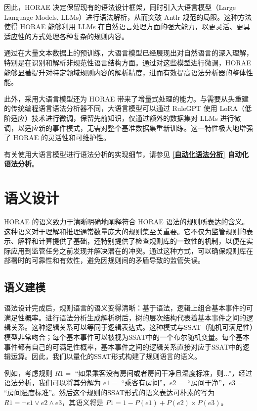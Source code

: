 因此，HORAE 决定保留现有的语法设计框架，同时引入大语言模型（Large Language Models, LLMs）进行语法解析，从而突破 Antlr 规范的局限。这种方法使得 HORAE 能够利用 LLMs 在自然语言处理方面的强大能力，以更灵活、更具适应性的方式处理各种复杂的规则内容。

通过在大量文本数据上的预训练，大语言模型已经展现出对自然语言的深入理解，特别是在识别和解析非规范性语言结构方面。通过对这些模型进行微调，HORAE 能够显著提升对特定领域规则内容的解析精度，进而有效提高语法分析器的整体性能。

此外，采用大语言模型还为 HORAE 带来了增量式处理的能力。与需要从头重建的传统编程语言语法分析器不同，大语言模型可以通过 RuleGPT 使用 LoRA（低阶适应）技术进行微调，保留先前知识，仅通过额外的数据集对 LLMs 进行微调，以适应新的事件模式，无需对整个基准数据集重新训练。这一特性极大地增强了 HORAE 的灵活性和可维护性。

有关使用大语言模型进行语法分析的实现细节，请参见 \textbf{\ref{自动化语法分析} 自动化语法分析}。

\cleardoublepage

\section{语义设计}

HORAE 的语义致力于清晰明确地阐释符合 HORAE 语法的规则所表达的含义。这种语义对于理解和推理通常数量庞大的规则集至关重要。它不仅为监管规则的表示、解释和计算提供了基础，还特别提供了检查规则库的一致性的机制，以便在实际应用到监管任务之前发现并解决潜在的冲突。通过这种方式，可以确保规则库在部署时的可靠性和有效性，避免因规则间的矛盾导致的监管失误。

\subsection{语义建模}

语法设计完成后，规则语言的语义变得清晰：基于语法，逻辑上组合基本事件的可满足性概率。进行语法分析生成解析树后，树的层次结构代表着基本事件之间的逻辑关系。这种逻辑关系可以等同于逻辑表达式。这种模式与SSAT（随机可满足性）模型非常吻合；每个基本事件可以被视为SSAT中的一个布尔随机变量。每个基本事件都有自己的可满足性概率，基本事件之间的逻辑关系直接对应于SSAT中的逻辑运算。因此，我们以量化的SSAT形式构建了规则语言的语义。

例如，考虑规则 $R1=$ “如果乘客没有房间或者房间干净且湿度标准，则...”，经过语法分析，我们可以将其分解为 $e1=$ “乘客有房间”，$e2=$ “房间干净”，$e3=$ “房间湿度标准”。然后这个规则的SSAT形式的语义表达可朴素的写为 $R1=\neg e1 \vee e2 \wedge e3$，其语义将是 $P1=1-P(e1)+P(e2)\times P(e3)$。

